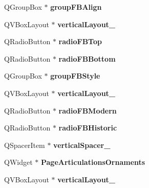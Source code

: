 \begin{DoxyCompactItemize}
Q\+Group\+Box $\ast$ {\bfseries group\+F\+B\+Align}
\item 
\mbox{\label{class_ui___edit_style_base_ae60e6a01a74827e02d13c5572328ff1e}} 
Q\+V\+Box\+Layout $\ast$ {\bfseries vertical\+Layout\+\_}
\item 
\mbox{\label{class_ui___edit_style_base_aabb77afdbf7be7fd5b32b0f2e1075627}} 
Q\+Radio\+Button $\ast$ {\bfseries radio\+F\+B\+Top}
\item 
\mbox{\label{class_ui___edit_style_base_a65bd8354d6faae9a641fc768a271bb13}} 
Q\+Radio\+Button $\ast$ {\bfseries radio\+F\+B\+Bottom}
\item 
\mbox{\label{class_ui___edit_style_base_af0e36b50e00e24740a208158646a73fa}} 
Q\+Group\+Box $\ast$ {\bfseries group\+F\+B\+Style}
\item 
\mbox{\label{class_ui___edit_style_base_a532f0e7cc661bd5db07908c3392933d6}} 
Q\+V\+Box\+Layout $\ast$ {\bfseries vertical\+Layout\+\_}
\item 
\mbox{\label{class_ui___edit_style_base_aa7549b03e0bfb459d9ad316aae0d8d7d}} 
Q\+Radio\+Button $\ast$ {\bfseries radio\+F\+B\+Modern}
\item 
\mbox{\label{class_ui___edit_style_base_abe305f9a91f652457a4396b88000218d}} 
Q\+Radio\+Button $\ast$ {\bfseries radio\+F\+B\+Historic}
\item 
\mbox{\label{class_ui___edit_style_base_a870e20888ada6ded247870901850345d}} 
Q\+Spacer\+Item $\ast$ {\bfseries vertical\+Spacer\+\_}
\item 
\mbox{\label{class_ui___edit_style_base_afa2c858d559e8a943409ba6a8c92a2b9}} 
Q\+Widget $\ast$ {\bfseries Page\+Articulations\+Ornaments}
\item 
\mbox{\label{class_ui___edit_style_base_a3d8aafaa38800f22f8e9a66f3e3b7b5c}} 
Q\+V\+Box\+Layout $\ast$ {\bfseries vertical\+Layout\+\_}

\end{DoxyCompactItemize}
